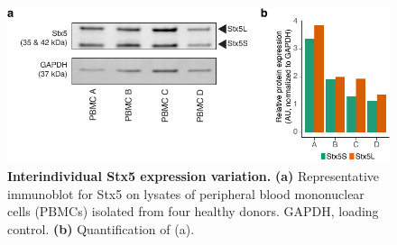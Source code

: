 \begin{figure}
    \includegraphics[keepaspectratio=true,width=\textwidth,height=\textheight]{chapters/chapter6/chapter6_SupplementaryFigure4.pdf}
    \caption{\textbf{Interindividual Stx5 expression variation.} \textbf{(a)} Representative immunoblot for Stx5 on lysates of peripheral blood mononuclear cells (PBMCs) isolated from four healthy donors. GAPDH, loading control. \textbf{(b)} Quantification of (a).
}
    \label{fig:ch6supfig4}
\end{figure}

\clearpage

